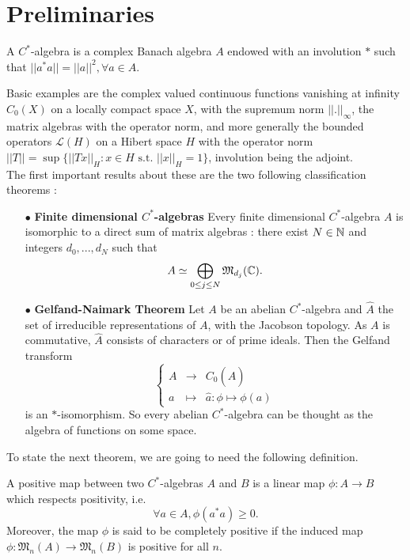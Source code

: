 \section{Preliminaries}

\begin{definition}
A $C^*$-algebra is a complex Banach algebra $A$ endowed with an involution $*$ such that $||a^*a||=||a||^2,\forall a\in A$.
\end{definition}

Basic examples are the complex valued continuous functions vanishing at infinity $C_0(X)$ on a locally compact space $X$, with the supremum norm $||.||_\infty$, the matrix algebras with the operator norm, and more generally the bounded operators $\mathcal L(H)$ on a Hibert space $H$ with the operator norm $||T||= \sup \{||Tx||_H : x\in H \text{ s.t. }||x||_H=1\}$, involution being the adjoint.\\

The first important results about these are the two following classification theorems :
\begin{itemize}
\item[$\bullet$] \textbf{Finite dimensional $C^*$-algebras} Every finite dimensional $C^*$-algebra $A$ is isomorphic to a direct sum of matrix algebras : there exist $N\in \mathbb N$ and integers $d_0,...,d_N$ such that \[A \simeq \bigoplus_{0\leq j \leq N} \mathfrak M_{d_j}(\mathbb C).\]
\item[$\bullet$] \textbf{Gelfand-Naimark Theorem} Let $A$ be an abelian $C^*$-algebra and $\hat A$ the set of irreducible representations of $A$, with the Jacobson topology. As $A$ is commutative, $\hat A$ consists of characters or of prime ideals. Then the Gelfand transform
\[\left\{\begin{array}{lll} A & \rightarrow & C_0(\hat A) \\ a & \mapsto & \hat a : \phi \mapsto \phi(a) \end{array}\right.\]
is an $*$-isomorphism. So every abelian $C^*$-algebra can be thought as the algebra of functions on some space.
\end{itemize}

To state the next theorem, we are going to need the following definition.
\begin{definition}
A positive map between two $C^*$-algebras $A$ and $B$ is a linear map $\phi : A\rightarrow B$ which respects positivity, i.e. 
\[\forall a\in A , \phi(a^*a)\geq 0.\]
Moreover, the map $\phi$ is said to be completely positive if the induced map $\phi : \mathfrak M_n(A) \rightarrow \mathfrak M_n(B)$ is positive for all $n$.
\end{definition}

